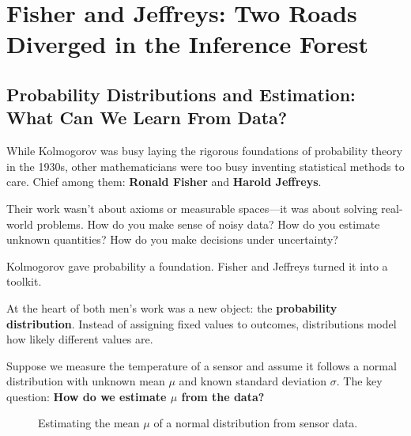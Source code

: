 \section{Fisher and Jeffreys: Two Roads Diverged in the Inference Forest}

\subsection{Probability Distributions and Estimation: What Can We Learn From Data?}

While Kolmogorov was busy laying the rigorous foundations of probability theory in the 1930s, other mathematicians were too busy inventing statistical methods to care. Chief among them: \textbf{Ronald Fisher} and \textbf{Harold Jeffreys}.

Their work wasn’t about axioms or measurable spaces—it was about solving real-world problems. How do you make sense of noisy data? How do you estimate unknown quantities? How do you make decisions under uncertainty?

Kolmogorov gave probability a foundation.  
Fisher and Jeffreys turned it into a toolkit.

At the heart of both men’s work was a new object: the \textbf{probability distribution}. Instead of assigning fixed values to outcomes, distributions model how likely different values are.

Suppose we measure the temperature of a sensor and assume it follows a normal distribution with unknown mean \( \mu \) and known standard deviation \( \sigma \). The key question: \textbf{How do we estimate \( \mu \) from the data?}


\begin{figure}[H]
\centering
{}
\caption{Estimating the mean \( \mu \) of a normal distribution from sensor data.}
\end{figure}



